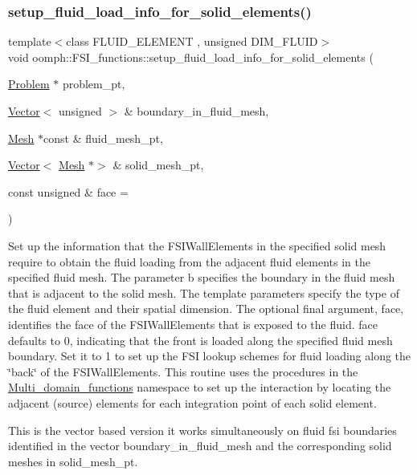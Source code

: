 \subsubsection{\texorpdfstring{setup\+\_\+fluid\+\_\+load\+\_\+info\+\_\+for\+\_\+solid\+\_\+elements()}{setup\_fluid\_load\_info\_for\_solid\_elements()}\hspace{0.1cm}{\footnotesize\ttfamily [1/2]}}
{\footnotesize\ttfamily template$<$class F\+L\+U\+I\+D\+\_\+\+E\+L\+E\+M\+E\+NT , unsigned D\+I\+M\+\_\+\+F\+L\+U\+ID$>$ \\
void oomph\+::\+F\+S\+I\+\_\+functions\+::setup\+\_\+fluid\+\_\+load\+\_\+info\+\_\+for\+\_\+solid\+\_\+elements (\begin{DoxyParamCaption}\item[{\hyperlink{classoomph_1_1Problem}{Problem} $\ast$}]{problem\+\_\+pt,  }\item[{\hyperlink{classoomph_1_1Vector}{Vector}$<$ unsigned $>$ \&}]{boundary\+\_\+in\+\_\+fluid\+\_\+mesh,  }\item[{\hyperlink{classoomph_1_1Mesh}{Mesh} $\ast$const \&}]{fluid\+\_\+mesh\+\_\+pt,  }\item[{\hyperlink{classoomph_1_1Vector}{Vector}$<$ \hyperlink{classoomph_1_1Mesh}{Mesh} $\ast$$>$ \&}]{solid\+\_\+mesh\+\_\+pt,  }\item[{const unsigned \&}]{face = {} }\end{DoxyParamCaption})}



Set up the information that the F\+S\+I\+Wall\+Elements in the specified solid mesh require to obtain the fluid loading from the adjacent fluid elements in the specified fluid mesh. The parameter b specifies the boundary in the fluid mesh that is adjacent to the solid mesh. The template parameters specify the type of the fluid element and their spatial dimension. The optional final argument, face, identifies the face of the F\+S\+I\+Wall\+Elements that is exposed to the fluid. face defaults to 0, indicating that the front is loaded along the specified fluid mesh boundary. Set it to 1 to set up the F\+SI lookup schemes for fluid loading along the \char`\"{}back\char`\"{} of the F\+S\+I\+Wall\+Elements. This routine uses the procedures in the \hyperlink{namespaceoomph_1_1Multi__domain__functions}{Multi\+\_\+domain\+\_\+functions} namespace to set up the interaction by locating the adjacent (source) elements for each integration point of each solid element. 

This is the vector based version it works simultaneously on fluid fsi boundaries identified in the vector boundary\+\_\+in\+\_\+fluid\+\_\+mesh and the corresponding solid meshes in solid\+\_\+mesh\+\_\+pt. 

